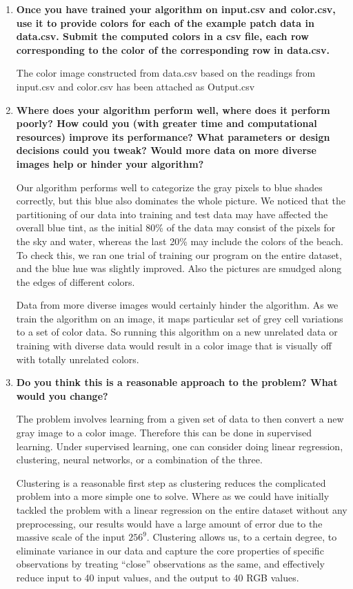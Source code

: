 \documentclass[a4paper]{article}
\begin{document}
\begin{enumerate}
\bigskip
\item \textbf{Once you have trained your algorithm on input.csv and color.csv, use it to provide colors for each of the example patch data in data.csv. Submit the computed colors in a csv file, each row corresponding to the color of the corresponding row in data.csv.}

The color image constructed from data.csv based on the readings from input.csv and color.csv has been attached as Output.csv

\bigskip
\item \textbf{Where does your algorithm perform well, where does it perform poorly? How could you (with greater time and computational resources) improve its performance? What parameters or design decisions could you tweak? Would more data on more diverse images help or hinder your algorithm?}

Our algorithm performs well to categorize the gray pixels to blue shades correctly, but this blue also dominates the whole picture. We noticed that the partitioning of our data into training and test data may have affected the overall blue tint, as the initial 80\% of the data may consist of the pixels for the sky and water, whereas the last 20\% may include the colors of the beach. To check this, we ran one trial of training our program on the entire dataset, and the blue hue was slightly improved. Also the pictures are smudged along the edges of different colors. 

Data from more diverse images would certainly hinder the algorithm. As we train the algorithm on an image, it maps particular set of grey cell variations to a set of color data. So running this algorithm on a new unrelated data or training with diverse data would result in a color image that is visually off with totally unrelated colors.
\bigskip
\item \textbf{Do you think this is a reasonable approach to the problem? What would you change?}

The problem involves learning from a given set of data to then convert a new gray image to a color image. Therefore this can be done in supervised learning. Under supervised learning, one can consider doing linear regression, clustering, neural networks, or a combination of the three. 

Clustering is a reasonable first step as clustering reduces the complicated problem into a more simple one to solve. Where as we could have initially tackled the problem with a linear regression on the entire dataset without any preprocessing, our results would have a large amount of error due to the massive scale of the input $256^9$. Clustering allows us, to a certain degree, to eliminate variance in our data and capture the core properties of specific observations by treating ``close'' observations as the same, and effectively reduce input to 40 input values, and the output to 40 RGB values. 


\end{enumerate}
\end{document}

